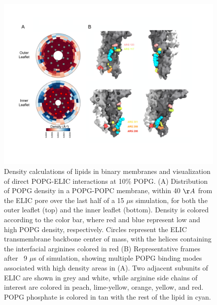 \begin{figure}
\center
\includegraphics[width=\linewidth]{./pandoc_test/media/image6.pdf}
	\begin{flushleft}

\caption[Density calculations of lipids in binary membranes and visualization of direct POPG-ELIC interactions at 10\% POPG.] {Density calculations of lipids in binary membranes and visualization of direct POPG-ELIC interactions at 10\% POPG. (A) Distribution of POPG density in a POPG-POPC membrane, within 40 $\AA$ from the ELIC pore over the last half of a 15 $\mu$s simulation, for both the outer leaflet (top) and the inner leaflet (bottom). Density is colored according to the color bar, where red and blue represent low and high POPG density, respectively. Circles represent the ELIC transmembrane backbone center of mass, with the helices containing the interfacial arginines colored in red (B) Representative frames after ~9 $\mu$s of simulation, showing multiple POPG binding modes associated with high density areas in (A). Two adjacent subunits of ELIC are shown in grey and white, while arginine side chains of interest are colored in peach, lime-yellow, orange, yellow, and red. POPG phosphate is colored in tan with the rest of the lipid in cyan.} \label{fig:seven}
	\end{flushleft}

\end{figure}



